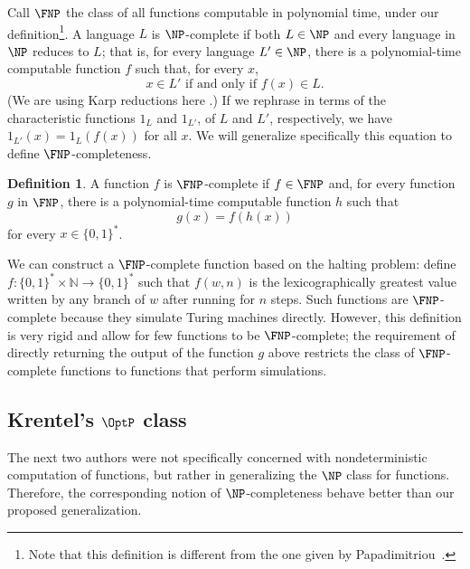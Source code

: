 \documentclass[12pt]{article}
\theoremstyle{definition}
\newtheorem{definition}{Definition}
\begin{document}
Call $\FNP$ the class of all functions computable in polynomial time,
under our definition\footnote{
    Note that this definition
    is different from the one given by Papadimitriou~\cite[p~229]{Papadimitriou1994}.
}.
A language $L$ is $\NP$-complete if both $L \in \NP$
and every language in $\NP$ reduces to $L$;
that is, for every language $L' \in \NP$,
there is a polynomial-time computable function $f$
such that, for every $x$,
\begin{equation*}
    x \in L' \text{ if and only if } f(x) \in L.
\end{equation*}
(We are using Karp reductions here \cite[p.~42]{AroraBarak2009}.)
If we rephrase in terms of the characteristic functions $1_L$ and $1_{L'}$,
of $L$ and $L'$, respectively,
we have $1_{L'}(x) = 1_L(f(x))$ for all $x$.
We will generalize specifically this equation to define $\FNP$-completeness.

\vspace{6pt}
\begin{definition}
    A function $f$ is $\FNP$-complete if $f \in \FNP$ and,
    for every function $g$ in $\FNP$,
    there is a polynomial-time computable function $h$ such that
    \begin{equation*}
        g(x) = f(h(x))
    \end{equation*}
    for every $x \in \{0, 1\}^*$.
\end{definition}

We can construct a $\FNP$-complete function based on the halting problem:
define $f : \{0, 1\}^* \times \mathbb N \to \{0, 1\}^*$
such that $f(w, n)$ is the lexicographically greatest value written by any branch of $w$
after running for $n$ steps.
Such functions are $\FNP$-complete
because they simulate Turing machines directly.
However, this definition is very rigid
and allow for few functions to be $\FNP$-complete;
the requirement of directly returning the output of the function $g$ above
restricts the class of $\FNP$-complete functions
to functions that perform simulations.

\subsection{Krentel's $\OptP$ class}
\label{sec:krentel}

The next two authors were not specifically concerned
with nondeterministic computation of functions,
but rather in generalizing the $\NP$ class for functions.
Therefore, the corresponding notion of $\NP$-completeness
behave better than our proposed generalization.
\end{document}
